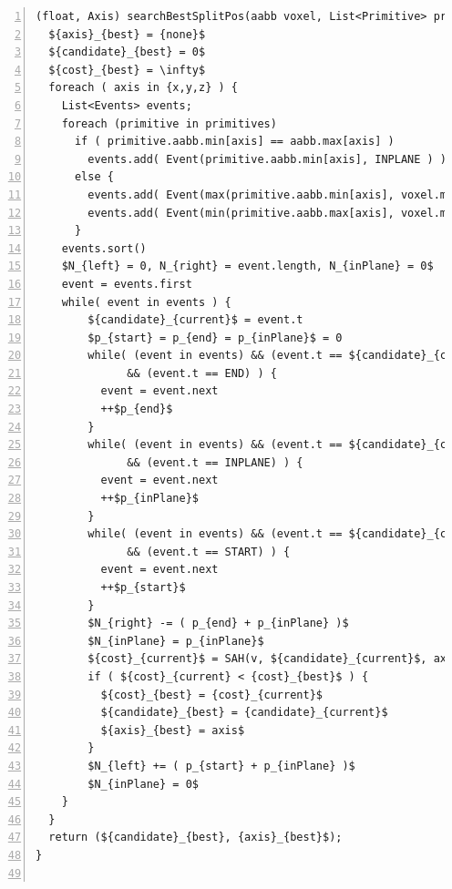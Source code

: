 \begin{lstlisting}[belowcaptionskip=8pt,float,mathescape=true,caption={Algorithmus zur Bestimmung der besten Trennebene in  $O(N {log}^2 N )$},label=sahnlog2n,numbers=left]
(float, Axis) searchBestSplitPos(aabb voxel, List<Primitive> primitives) {
  ${axis}_{best} = {none}$
  ${candidate}_{best} = 0$
  ${cost}_{best} = \infty$
  foreach ( axis in {x,y,z} ) {
    List<Events> events;
    foreach (primitive in primitives)
      if ( primitive.aabb.min[axis] == aabb.max[axis] )
        events.add( Event(primitive.aabb.min[axis], INPLANE ) );
      else {
        events.add( Event(max(primitive.aabb.min[axis], voxel.min[axis]), START) )
        events.add( Event(min(primitive.aabb.max[axis], voxel.max[axis]), END) )
      }
    events.sort()
    $N_{left} = 0, N_{right} = event.length, N_{inPlane} = 0$
    event = events.first
    while( event in events ) {
        ${candidate}_{current}$ = event.t
        $p_{start} = p_{end} = p_{inPlane}$ = 0
        while( (event in events) && (event.t == ${candidate}_{current}$)
              && (event.t == END) ) {
          event = event.next
          ++$p_{end}$
        }
        while( (event in events) && (event.t == ${candidate}_{current}$)
              && (event.t == INPLANE) ) {
          event = event.next
          ++$p_{inPlane}$
        }
        while( (event in events) && (event.t == ${candidate}_{current}$)
              && (event.t == START) ) {
          event = event.next
          ++$p_{start}$
        }
        $N_{right} -= ( p_{end} + p_{inPlane} )$
        $N_{inPlane} = p_{inPlane}$
        ${cost}_{current}$ = SAH(v, ${candidate}_{current}$, axis, $N_{left}, N_{right}, N_{inPlane}$);
        if ( ${cost}_{current} < {cost}_{best}$ ) {
          ${cost}_{best} = {cost}_{current}$
          ${candidate}_{best} = {candidate}_{current}$
          ${axis}_{best} = axis$
        }
        $N_{left} += ( p_{start} + p_{inPlane} )$
        $N_{inPlane} = 0$
    }
  }
  return (${candidate}_{best}, {axis}_{best}$);
}


\end{lstlisting}

